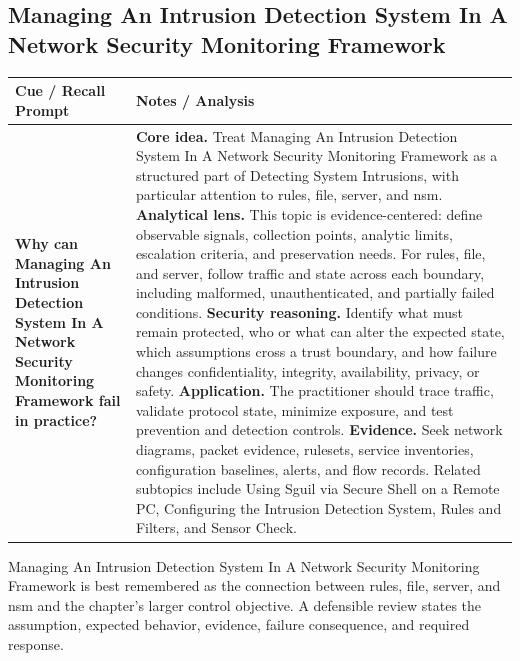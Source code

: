 \documentclass[11pt]{article}
\newcommand{\CornellHeader}{%
\rowcolor{Navy}\color{white}\bfseries Cue / Recall Prompt & \color{white}\bfseries Notes / Analysis\\\hline}
\newcommand{\CornellRow}[2]{%
\cellcolor{CueGray}\RaggedRight\textbf{#1} & \RaggedRight #2\\\hline}
\begin{document}
\subsection*{Managing An Intrusion Detection System In A Network Security Monitoring Framework}
\begin{longtable}{>{\RaggedRight\arraybackslash}p{}|>{\RaggedRight\arraybackslash}p{}}
\CornellHeader
\CornellRow{Why can Managing An Intrusion Detection System In A Network Security Monitoring Framework fail in practice?}{\textbf{Core idea.} Treat Managing An Intrusion Detection System In A Network Security Monitoring Framework as a structured part of Detecting System Intrusions, with particular attention to rules, file, server, and nsm. \textbf{Analytical lens.} This topic is evidence-centered: define observable signals, collection points, analytic limits, escalation criteria, and preservation needs. For rules, file, and server, follow traffic and state across each boundary, including malformed, unauthenticated, and partially failed conditions. \textbf{Security reasoning.} Identify what must remain protected, who or what can alter the expected state, which assumptions cross a trust boundary, and how failure changes confidentiality, integrity, availability, privacy, or safety. \textbf{Application.} The practitioner should trace traffic, validate protocol state, minimize exposure, and test prevention and detection controls. \textbf{Evidence.} Seek network diagrams, packet evidence, rulesets, service inventories, configuration baselines, alerts, and flow records. Related subtopics include Using Sguil via Secure Shell on a Remote PC, Configuring the Intrusion Detection System, Rules and Filters, and Sensor Check.}
\end{longtable}
\begin{topicsummary}
Managing An Intrusion Detection System In A Network Security Monitoring Framework is best remembered as the connection between rules, file, server, and nsm and the chapter's larger control objective. A defensible review states the assumption, expected behavior, evidence, failure consequence, and required response.
\end{topicsummary}
\end{document}
